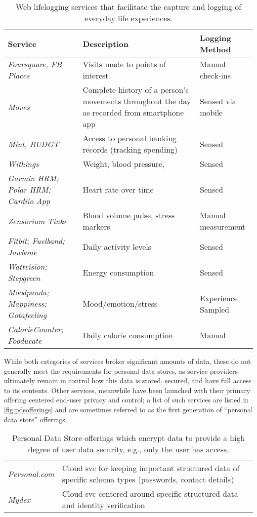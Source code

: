 \documentclass[graybox]{svmult}
\begin{document}
\begin{table}
\begin{tabular}{p{3cm} p{4.5cm} p{2.54cm}}
Service & Description & Logging Method \\
\hline
\emph{Foursquare, FB Places} & Visits made to points of interest & Manual check-ins \\
\emph{Moves} & Complete history of a person's movements throughout the day as recorded from smartphone app  & Sensed via mobile \\ 
\emph{Mint, BUDGT} & Access to personal banking records (tracking spending) & Sensed\\
\emph{Withings} & Weight, blood pressure,& Sensed \\
\emph{Garmin HRM; Polar HRM; Cardiio App} & Heart rate over time & Sensed \\
\emph{Zensorium Tinke} & Blood volume pulse, stress markers & Manual measurement \\
\emph{Fitbit; Fuelband; Jawbone} & Daily activity levels & Sensed \\ 
\emph{Wattvision; Stepgreen} & Energy consumption & Sensed \\
\emph{Moodpanda; Mappiness; Gotafeeling} & Mood/emotion/stress & Experience Sampled \\
\emph{CalorieCounter; Fooducate} & Daily calorie consumption & Manual \\
\end{tabular}
\caption{Web lifelogging services that facilitate the capture and logging of everyday life experiences. }
\label{fig:aboutme}
\end{table}

While both categories of services broker significant amounts of data, these do not generally meet the requirements for personal data stores, as service providers ultimately remain in control how this data is stored, secured, and have full access to its contents.  Other services, meanwhile have been launched with their primary offering centered end-user privacy and control; a list of such services are listed in \ref{fig:pdsofferings} and are sometimes referred to as the first generation of ``personal data store'' offerings.

\begin{table}
\begin{tabular}{l p{8.5cm}}
\emph{Personal.com} & Cloud svc for keeping important structured data of specific schema types (passwords, contact details)  \\
\emph{Mydex} & Cloud svc centered around specific structured data and identity verification  \\
\end{tabular}
\caption{Personal Data Store offerings which encrypt data to provide a high degree of user data security, e.g., only the user has access.}
\label{fig:pdsofferingsp}
\end{table}
\end{document}
